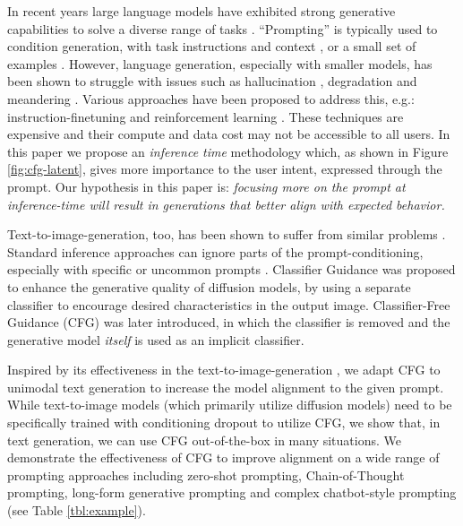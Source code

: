 \documentclass{article}
\begin{document}
In recent years large language models have exhibited strong generative capabilities to solve a diverse range of tasks \cite{devlin-etal-2019-bert,brown2020language,scao2022bloom}. ``Prompting'' is typically used to condition generation, with task instructions and context \cite{reynolds2021prompt}, or a small set of examples \cite{brown2020language}. However, language generation, especially with smaller models, has been shown to struggle with issues such as hallucination \cite{manakul2023selfcheckgpt}, degradation \cite{holtzman2019curious} and meandering \cite{spangher2023sequentially}.
Various approaches have been proposed to address this, e.g.: instruction-finetuning \cite{flan,sanhmultitask} and reinforcement learning \cite{instructgpt,alignment,bai2022constitutional}. These techniques are expensive and their compute and data cost may not be accessible to all users. In this paper we propose an \textit{inference time} methodology which, as shown in Figure \ref{fig:cfg-latent}, gives more importance to the user intent, expressed through the prompt. Our hypothesis in this paper is: \textit{focusing more on the prompt at inference-time will result in generations that better align with expected behavior.}

Text-to-image-generation, too, has been shown to suffer from similar problems \cite{guidance}. Standard inference approaches can ignore parts of the prompt-conditioning, especially with specific or uncommon prompts \cite{glide}. Classifier Guidance \cite{guidance} was proposed to enhance the generative quality of diffusion models, by using a separate classifier to encourage desired characteristics in the output image. Classifier-Free Guidance (CFG) \cite{cfg} was later introduced, in which the classifier is removed and the generative model \textit{itself} is used as an implicit classifier. 

Inspired by its effectiveness in the text-to-image-generation \cite{imagen,cfg,cfgfix}, we adapt CFG to unimodal text generation to increase the model alignment to the given prompt. While text-to-image models (which primarily utilize diffusion models) need to be specifically trained with conditioning dropout \cite{cfg} to utilize CFG, we show that, in text generation, we can use CFG out-of-the-box in many situations. We demonstrate the effectiveness of CFG to improve alignment on a wide range of prompting approaches including zero-shot prompting, Chain-of-Thought prompting, long-form generative prompting and complex chatbot-style prompting (see Table \ref{tbl:example}).
\end{document}

